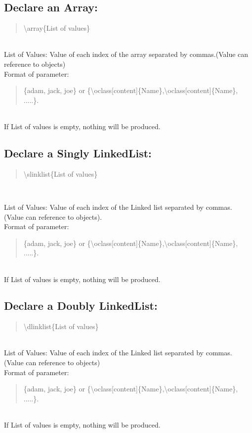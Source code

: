 \documentclass[10pt,a4paper,english]{article}
\begin{document}
\begin{flushleft}
\subsection*{Declare an Array:}
\begin{quote}{\ttfamily \raggedright \noindent
{\textbackslash}array{\{}List of values{\}} 
}\end{quote}
~\\ \medskip
List of Values: Value of each index of the array separated by commas.(Value can reference to objects)
~\\ \medskip
Format of parameter:
~\\
\begin{quote}{\ttfamily \raggedright \noindent
{\{}adam, jack, joe{\}} or {\{}{\textbackslash}oclass[content]{\{}Name{\}},{\textbackslash}oclass[content]{\{}Name{\}}, .....{\}}. 
}\end{quote}
~\\
If List of values is empty, nothing will be produced.

\subsection*{Declare a Singly LinkedList:}
\begin{quote}{\ttfamily \raggedright \noindent
{\textbackslash}slinklist{{\{}List of values{\}} 
}}\end{quote}
~\\ \medskip

List of Values: Value of each index of the Linked list separated by commas. (Value can reference to objects). 
~\\ \medskip
Format of parameter:
~\\
\begin{quote}{\ttfamily \raggedright \noindent
{\{}adam, jack, joe{\}} or {\{}{\textbackslash}oclass[content]{\{}Name{\}},{\textbackslash}oclass[content]{\{}Name{\}}, .....{\}}. 
}\end{quote} ~\\
If List of values is empty, nothing will be produced.

\subsection*{Declare a Doubly LinkedList:}
\begin{quote}{\ttfamily \raggedright \noindent
{\textbackslash}dlinklist{\{}List of values{\}} 
}\end{quote}
~\\ \medskip
List of Values: Value of each index of the Linked list separated by commas. (Value can reference to objects) 
~\\ \medskip
Format of parameter:
~\\
\begin{quote}{\ttfamily \raggedright \noindent
{\{}adam, jack, joe{\}} or {\{}{\textbackslash}oclass[content]{\{}Name{\}},{\textbackslash}oclass[content]{\{}Name{\}}, .....{\}}. 
}\end{quote}
~\\
If List of values is empty, nothing will be produced.


\end{flushleft}
\end{document}
